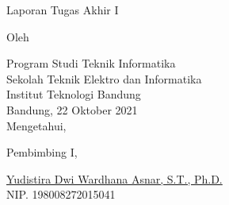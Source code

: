 \clearpage
\pagestyle{empty}

\begin{center}
    \smallskip

    \Large \bfseries \MakeUppercase{\thetitle}
    \vfill

    \Large Laporan Tugas Akhir I
    \vfill

    \large Oleh

    \Large \theauthor

    \large Program Studi Teknik Informatika \\

    \normalsize \normalfont
    Sekolah Teknik Elektro dan Informatika \\
    Institut Teknologi Bandung \\

    \vfill
    \normalsize \normalfont
    Bandung, 22 Oktober 2021 \\
    Mengetahui,

    \vspace{0.5cm}
    Pembimbing I,

    \vfill
    \underline{Yudistira Dwi Wardhana Asnar, S.T., Ph.D.} \\
    NIP. 198008272015041

\end{center}
\clearpage

